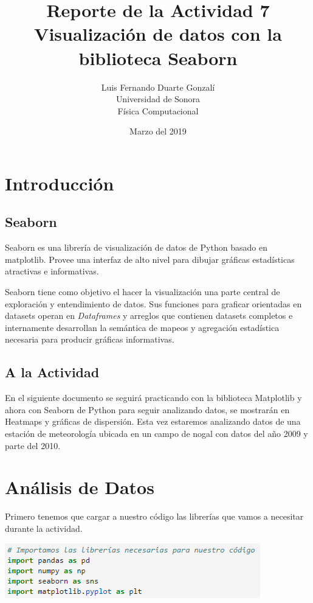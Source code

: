 \documentclass{article}
\title{\textbf{Reporte de la Actividad 7}\\ Visualización de datos con la biblioteca Seaborn}
\author{Luis Fernando Duarte Gonzalí \\ Universidad de Sonora \\ Física Computacional}
\date{Marzo del 2019}
\begin{document}
\maketitle


\section{Introducción}
\subsection{Seaborn}
Seaborn es una librería de visualización de datos de Python basado en matplotlib. Provee una interfaz de alto nivel para dibujar gráficas estadísticas atractivas e informativas.

Seaborn tiene como objetivo el hacer la visualización una parte central de exploración y entendimiento de datos. Sus funciones para graficar orientadas en datasets operan en \textit{Dataframes} y arreglos que contienen datasets completos e internamente desarrollan la semántica de mapeos y agregación estadística necesaria para producir gráficas informativas.

\subsection{A la Actividad}

\noindent En el siguiente documento se seguirá practicando con la biblioteca Matplotlib y ahora con Seaborn de Python para seguir analizando datos, se mostrarán en Heatmaps y gráficas de dispersión. Esta vez estaremos analizando datos de una estación de meteorología ubicada en un campo de nogal con datos del año 2009 y parte del 2010.

\section{Análisis de Datos}
Primero tenemos que cargar a nuestro código las librerías que vamos a necesitar durante la actividad.
\begin{center}
    \includegraphics[scale = 0.7]{import.png}
\end{center}
\end{document}
